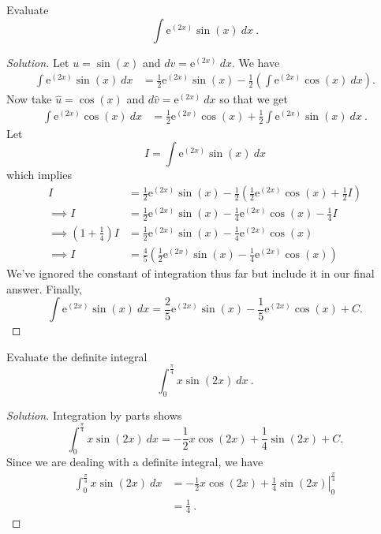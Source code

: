 \documentclass[compacto,10pt,comentarios]{aleph-notas}
\begin{document}
\begin{ejer}
    Evaluate
    $$
        \int \mathrm{e}^{(2x)} \sin(x) ~ dx ~ .
    $$
\end{ejer}
\begin{proof}[Solution]
    Let $u = \sin(x)$ and $dv = \mathrm{e}^{(2x)} ~ dx$. We have
    \begin{align*}
        \int \mathrm{e}^{(2x)} \sin(x) ~ dx
        & = \frac{1}{2}\mathrm{e}^{(2x)}\sin(x) - \frac{1}{2} \left( \int \mathrm{e}^{(2x)} \cos(x) ~ dx \right) .
    \end{align*}
    Now take $\hat{u} = \cos(x)$ and $d\hat{v} = \mathrm{e}^{(2x)} ~ dx$ so that we get
    \begin{align*}
        \int \mathrm{e}^{(2x)} \cos(x) ~ dx 
        & = \frac{1}{2}\mathrm{e}^{(2x)}\cos(x) + \frac{1}{2} \int \mathrm{e}^{(2x)}\sin(x) ~ dx ~ .
    \end{align*}
    Let
    $$
        I = \int \mathrm{e}^{(2x)} \sin(x) ~ dx
    $$
    which implies
    \begin{align*}
        I & = \frac{1}{2}\mathrm{e}^{(2x)}\sin(x) -\frac{1}{2} \left( \frac{1}{2}\mathrm{e}^{(2x)}\cos(x) + \frac{1}{2} I  \right) \\
        \implies I & = \frac{1}{2}\mathrm{e}^{(2x)}\sin(x) - \frac{1}{4}\mathrm{e}^{(2x)}\cos(x) - \frac{1}{4} I  \\
        \implies \left( 1 + \frac{1}{4} \right) I & = \frac{1}{2}\mathrm{e}^{(2x)}\sin(x) - \frac{1}{4}\mathrm{e}^{(2x)}\cos(x) \\
        \implies I & = \frac{4}{5} \left( \frac{1}{2}\mathrm{e}^{(2x)}\sin(x) - \frac{1}{4}\mathrm{e}^{(2x)}\cos(x) \right)
    \end{align*}
    We've ignored the constant of integration thus far but include it in our final answer. Finally,
    $$
    \int \mathrm{e}^{(2x)} \sin(x) ~ dx = \frac{2}{5}\mathrm{e}^{(2x)}\sin(x) - \frac{1}{5}\mathrm{e}^{(2x)}\cos(x) + C .
    $$
\end{proof}

\begin{ejer}
    Evaluate the definite integral
    $$
        \int_{0}^{\frac{\pi}{4}} x \sin(2x) ~ dx ~ .
    $$
\end{ejer}
\begin{proof}[Solution]
    Integration by parts shows
    $$
        \int_{0}^{\frac{\pi}{4}} x \sin(2x) ~ dx
        = -\frac{1}{2}x\cos(2x) + \frac{1}{4} \sin(2x) + C.
    $$
    Since we are dealing with a definite integral, we have
    \begin{align*}
        \int_{0}^{\frac{\pi}{4}} x \sin(2x) ~ dx
        & = \left. -\frac{1}{2}x\cos(2x) + \frac{1}{4} \sin(2x) \right\rvert_{0}^{\frac{\pi}{4}} \\
        & = \frac{1}{4} ~ .
    \end{align*}
\end{proof}
\end{document}
